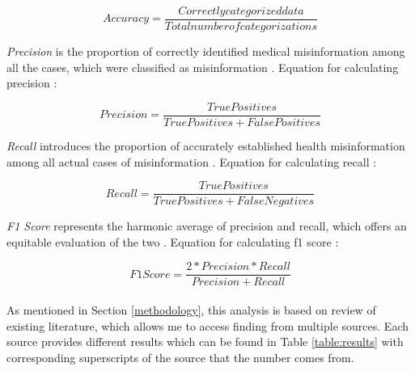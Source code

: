\documentclass[11pt ,english,a4paper]{article}
\begin{document}
\begin{equation}
Accuracy = \frac{Correctly categorized data}{Total number of categorizations}
\end{equation}

\emph{Precision} is the proportion of correctly identified medical misinformation among all the cases, which were classified as misinformation \cite{aph18detect}. Equation for calculating precision \cite{sha20mach}:

\begin{equation}
Precision = \frac{True Positives}{True Positives + False Positives}
\end{equation}

\emph{Recall} introduces the proportion of accurately established health misinformation among all actual cases of misinformation \cite{aph18detect}. Equation for calculating recall \cite{sha20mach}:

\begin{equation}
Recall = \frac{True Positives}{True Positives + False Negatives}
\end{equation}

\emph{F1 Score} represents the harmonic average of precision and recall, which offers an equitable evaluation of the two \cite{aph18detect}. Equation for calculating f1 score \cite{sha20mach}:

\begin{equation}
F1 Score = \frac{2*Precision*Recall}{Precision + Recall}
\end{equation}

\paragraph{} As mentioned in Section \ref{methodology}, this analysis is based on review of existing literature, which allows me to access finding from multiple sources. Each source provides different results which can be found in Table \ref{table:results} with corresponding superscripts of the source that the number comes from. 
\end{document}
